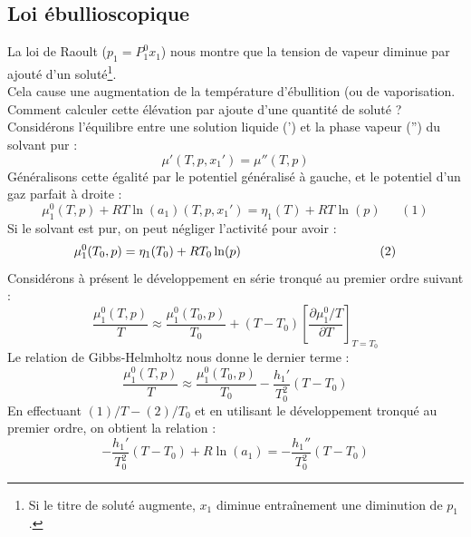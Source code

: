 \documentclass[british,french,11pt, a4paper, openany]{book}
\begin{document}
	\subsection{Loi ébullioscopique}
	La loi de Raoult ($p_1 = P_1^0x_1$) nous montre que la tension de vapeur diminue par ajouté d'un soluté\footnote{Si le titre de soluté augmente, $x_1$ diminue entraînement une diminution de $p_1$.}. \\
	Cela cause une augmentation de la température d'ébullition (ou de vaporisation. Comment calculer cette élévation par ajoute d'une quantité de soluté ? Considérons l'équilibre entre une solution liquide (') et la phase vapeur ('') du solvant pur :
	\begin{equation}
	\mu'(T,p,x_1') = \mu ''(T,p)
	\end{equation}
	Généralisons cette égalité par le potentiel généralisé à gauche, et le potentiel d'un gaz parfait à droite :
	\begin{equation}
	\mu_1^0(T,p) + RT\ln(a_1)(T,p,x_1') = \eta_1(T) + RT\ln(p)\ \ \ \ \ \ \ (1)
	\end{equation}
	Si le solvant est pur, on peut négliger l'activité pour avoir : 
	\begin{equation}
	\mu_1^0(T_0,p) = \eta_1(T_0) + RT_0\ln(p)\ \ \ \ \ \ \ \ \ \ \ \ \ \ \ \ \ \ \ \ \ \  \ \ \ \ \ \\ \ \ \ \ \ \ \ (2)
	\end{equation}
	Considérons à présent le développement en série tronqué au premier ordre suivant : 
	\begin{equation}
	\frac{\mu_1^0(T,p)}{T} \approx \frac{\mu_1^0(T_0,p)}{T_0} + (T-T_0)\left[\frac{\partial \mu_1^0 / T}{\partial T}\right]_{T = T_0}
	\end{equation}
	Le relation de Gibbs-Helmholtz nous donne le dernier terme :
	\begin{equation}
	\frac{\mu_1^0(T,p)}{T} \approx \frac{\mu_1^0(T_0,p)}{T_0}- \frac{h_1'}{T_0^2} (T-T_0)
	\end{equation}
	En effectuant $(1)/T - (2)/T_0$ et en utilisant le développement tronqué au premier ordre, on obtient la relation :
	\begin{equation}
	-\frac{h_1'}{T_0^2}(T-T_0) + R\ln(a_1) = -\frac{h_1''}{T_0^2}(T-T_0)
	\end{equation}
	
\end{document}
